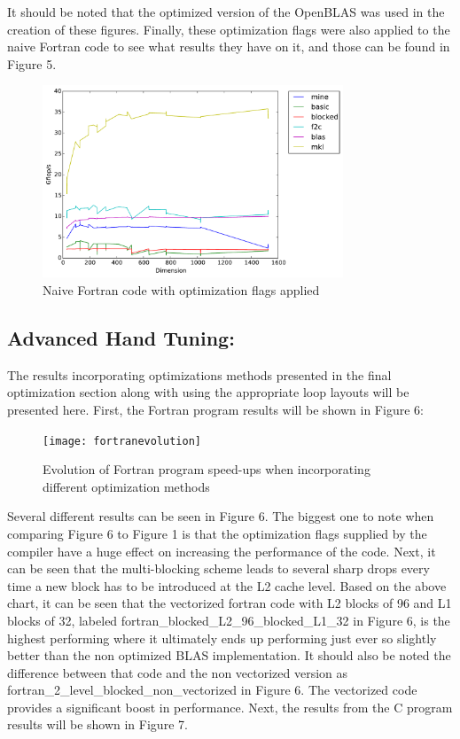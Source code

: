 \documentclass{article}
\begin{document}
\noindent  It should be noted that the optimized version of the OpenBLAS was used in the creation of these figures. Finally, these optimization flags were also applied to the naive Fortran code to see what results they have on it, and those can be found in Figure 5.

\begin{figure}[H]
  \centering
    \includegraphics[width=0.8\textwidth]{naive_fortran_opt_flags}
    \caption{Naive Fortran code with optimization flags applied}
\end{figure}

\subsection{Advanced Hand Tuning:}

The results incorporating optimizations methods presented in the final optimization section along with using the appropriate loop layouts will be presented here. First, the Fortran program results will be shown in Figure 6:

\begin{figure}[H]
  \centering
    \texttt{[image: fortranevolution]}
    \caption{Evolution of Fortran program speed-ups when incorporating different optimization methods}
\end{figure}

\noindent Several different results can be seen in Figure 6. The biggest one to note when comparing Figure 6 to Figure 1 is that the optimization flags supplied by the compiler have a huge effect on increasing the performance of the code. Next, it can be seen that the multi-blocking scheme leads to several sharp drops every time a new block has to be introduced at the L2 cache level. Based on the above chart, it can be seen that the vectorized fortran code with L2 blocks of 96 and L1 blocks of 32, labeled fortran\_blocked\_L2\_96\_blocked\_L1\_32 in Figure 6, is the highest performing where it ultimately ends up performing just ever so slightly better than the non optimized BLAS implementation. It should also be noted the difference between that code and the non vectorized version as fortran\_2\_level\_blocked\_non\_vectorized in Figure 6. The vectorized code provides a significant boost in performance. Next, the results from the C program results will be shown in Figure 7.
\end{document}
